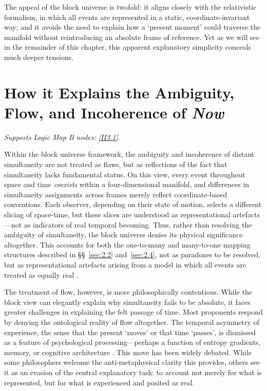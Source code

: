 \documentclass[12pt]{book}
\begin{document}
The appeal of the block universe is twofold: it aligns closely with the relativistic formalism, in which all events are represented in a static, coordinate-invariant way; and it avoids the need to explain how a `present moment' could traverse the manifold without reintroducing an absolute frame of reference. Yet as we will see in the remainder of this chapter, this apparent explanatory simplicity conceals much deeper tensions.

\section[How it Explains Relativistic Ambiguity, Flow, and Incoherence]{How it Explains the Ambiguity, Flow, and Incoherence of \textit{Now}}\label{sec:3.2}
\noindent\textit{Supports Logic Map B nodes: \hyperref[appendix:II3.1]{[II3.1]}.}

\vspace{4pt}

Within the block universe framework, the ambiguity and incoherence of distant simultaneity are not treated as flaws, but as reflections of the fact that simultaneity lacks fundamental status. On this view, every event throughout space and time \textit{coexists} within a four-dimensional manifold, and differences in simultaneity assignments across frames merely reflect coordinate-based conventions. Each observer, depending on their state of motion, selects a different slicing of space-time, but these slices are understood as representational artefacts---not as indicators of real temporal becoming. Thus, rather than resolving the ambiguity of simultaneity, the block universe denies its physical significance altogether. This accounts for both the one-to-many and many-to-one mapping structures described in \S\S~\ref{sec:2.2} and~\ref{sec:2.4}, not as paradoxes to be resolved, but as representational artefacts arising from a model in which all events are treated as equally real \citep{putnam1967,skow2015,Callender2011a}.

The treatment of flow, however, is more philosophically contentious. While the block view can elegantly explain why simultaneity fails to be absolute, it faces greater challenges in explaining the felt passage of time. Most proponents respond by denying the ontological reality of flow altogether. The temporal asymmetry of experience, the sense that the present `moves' or that time `passes', is dismissed as a feature of psychological processing---perhaps a function of entropy gradients, memory, or cognitive architecture \citep{price1996,callender2017}. This move has been widely debated. While some philosophers welcome the anti-metaphysical clarity this provides, others see it as an evasion of the central explanatory task: to account not merely for what is represented, but for what is experienced and posited as real.
\end{document}
